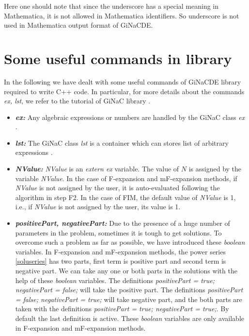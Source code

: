 \documentclass[prd,aps,floats,showkeys,nofootinbib,notitlepage]{revtex4-2}
\begin{document}
	Here one should note that since the underscore has a special meaning in Mathematica, it is not allowed in Mathematica identifiers. So underscore is not used in Mathematica output format of GiNaCDE. 
	\section{Some useful commands in library}\label{sec:command}
	In the following we have dealt with some useful commands of GiNaCDE library required to write C++ code. In particular, for more details about the commands {\em ex, lst}, we refer to the tutorial of GiNaC library \cite{ginac}.
	\begin{itemize}
		\item[] {\em \textbf{ex:}}  Any algebraic expressions or numbers are handled by the GiNaC class {\em ex} \cite{ginac}. 
		\item[] {\em \textbf{lst:}} The GiNaC class {\em lst} is a container  which can stores list of arbitrary expressions \cite{ginac}.
		\item[] {\em \textbf{NValue:}} {\em NValue} is an {\em extern ex} variable. The value of $N$ is assigned by the variable {\em NValue}. In the case of F-expansion and mF-expansion methods, if {\em NValue} is not assigned by the user, it is auto-evaluated following the algorithm in step F2. In the case of FIM, the default value of {\em NValue} is 1, i.e., if {\em NValue} is not assigned by the user, its value is 1.
		
		\item[] {\em \textbf{positivePart, negativePart:}} Due to the presence of a huge number of parameters in the problem, sometimes it is tough to get solutions. To overcome such a problem as far as possible, we have introduced these {\em boolean} variables. In F-expansion and mF-expansion methods, the power series \eqref{soluseries}
		has two parts, first term is positive part and second term is negative part. We can take any one or both parts in the solutions with the help of these {\em boolean} variables. The definitions {\em positivePart = true; negativePart = false;} will take the positive part. The definitions {\em positivePart = false; negativePart = true;} will take negative part, and the both parts are taken with the definitions {\em positivePart = true; negativePart = true;}. By default the last definition is active. These {\em boolean} variables are only available in F-expansion and mF-expansion methods. 
		

\end{itemize}
\end{document}
